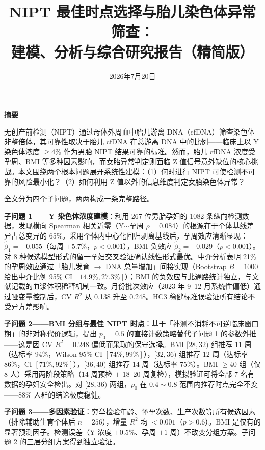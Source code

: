 \documentclass{mcm-paper}
\title{NIPT 最佳时点选择与胎儿染色体异常筛查：\\建模、分析与综合研究报告（精简版）}
\date{2026年7月20日}
\begin{document}
\maketitle

\begin{center}
{\Large\bfseries 摘\quad 要}
\end{center}

\vspace{0.5em}

无创产前检测（NIPT）通过母体外周血中胎儿游离 DNA（cfDNA）筛查染色体非整倍体，其可靠性取决于胎儿 cfDNA 在总游离 DNA 中的比例——临床上以 Y 染色体浓度 $\geq 4\%$ 作为男胎 NIPT 结果可靠的标准。然而，胎儿 cfDNA 浓度受孕周、BMI 等多种因素影响，而女胎异常判定则面临 Z 值信号意外缺位的核心挑战。本文围绕两个根本问题展开系统性建模：（1）何时进行 NIPT 可使检测不可靠的风险最小化？（2）如何利用 Z 值以外的信息维度判定女胎染色体异常？

全文分为四个子问题，两两构成一条完整路径。

\textbf{子问题 1——Y 染色体浓度建模}：利用 267 位男胎孕妇的 1082 条纵向检测数据，发现横向 Spearman 相关近零（Y$\sim$孕周 $\rho=0.084$）的根源在于个体基线差异占总变异的 65\%。采用个体内中心化回归剥离基线后，孕周效应清晰显现：$\hat{\beta}_1=+0.055$（每周 $+5.7\%$，$p<0.001$），BMI 负效应 $\hat{\beta}_2=-0.029$（$p<0.001$）。对 8 种候选模型形式的留一孕妇交叉验证确认线性形式最优。中介分析表明 21\% 的孕周效应通过「胎儿发育 $\to$ DNA 总量增加」间接实现（Bootstrap $B=1000$ 给出中介比例 95\% CI $[14.9\%, 27.3\%]$）；BMI 的负效应与此通路统计独立，与文献记载的血浆体积稀释机制一致。月份批次效应（2023 年 9--12 月系统性偏低）通过哑变量控制后，CV $R^2$ 从 0.138 升至 0.248。HC3 稳健标准误验证所有结论不受异方差影响。

\textbf{子问题 2——BMI 分组与最佳 NIPT 时点}：基于「补测不消耗不可逆临床窗口期」的非对称代价逻辑，提出 $p_0=0.5$ 的直接计数策略替代子问题 1 的参数外推——这是因 CV $R^2=0.248$ 偏低而采取的保守选择。BMI $[28,32)$ 组推荐 11 周（达标率 94\%，Wilson 95\% CI $[74\%,99\%]$），$[32,36)$ 组推荐 12 周（达标率 86\%，CI $[71\%,92\%]$），$[36,40)$ 组推荐 14 周（达标率 75\%）。BMI $\geq 40$ 组（仅 8 人）采用两阶段策略（14 周预检 $+$ 18--20 周复检），模拟验证可将全部 7 名有数据的孕妇安全检出。对 $[28,36)$ 两组，$p_0$ 在 $0.4\sim0.8$ 范围内推荐时点完全不变——88\% 人群的结论极度稳健。

\textbf{子问题 3——多因素验证}：穷举检验年龄、怀孕次数、生产次数等所有候选因素（排除辅助生育个体后 $n=256$），增量 $R^2$ 均 $<0.001$（$p>0.6$）。BMI 是仅有的显著预测因子。检测误差（Y 浓度 $\pm 0.5\%$、孕周 $\pm 1$ 周）不改变分组方案。子问题 2 的三层分组方案得到独立验证。
\end{document}
